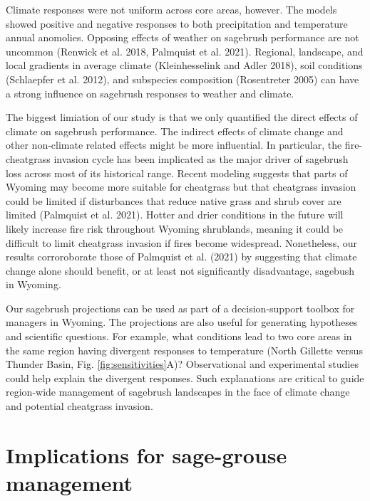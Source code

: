 \documentclass[
  12pt,
]{article}
\begin{document}
Climate responses were not uniform across core areas, however.
The models showed positive and negative responses to both precipitation and temperature annual anomolies.
Opposing effects of weather on sagebrush performance are not uncommon (Renwick et al. 2018, Palmquist et al. 2021).
Regional, landscape, and local gradients in average climate (Kleinhesselink and Adler 2018), soil conditions (Schlaepfer et al. 2012), and subspecies composition (Rosentreter 2005) can have a strong influence on sagebrush responses to weather and climate.

The biggest limiation of our study is that we only quantified the direct effects of climate on sagebrush performance.
The indirect effects of climate change and other non-climate related effects might be more influential.
In particular, the fire-cheatgrass invasion cycle has been implicated as the major driver of sagebrush loss across most of its historical range.
Recent modeling suggests that parts of Wyoming may become more suitable for cheatgrass but that cheatgrass invasion could be limited if disturbances that reduce native grass and shrub cover are limited (Palmquist et al. 2021).
Hotter and drier conditions in the future will likely increase fire risk throughout Wyoming shrublands, meaning it could be difficult to limit cheatgrass invasion if fires become widespread.
Nonetheless, our results corroroborate those of Palmquist et al. (2021) by suggesting that climate change alone should benefit, or at least not significantly disadvantage, sagebush in Wyoming.

Our sagebrush projections can be used as part of a decision-support toolbox for managers in Wyoming.
The projections are also useful for generating hypotheses and scientific questions.
For example, what conditions lead to two core areas in the same region having divergent responses to temperature (North Gillette versus Thunder Basin, Fig. \ref{fig:sensitivities}A)?
Observational and experimental studies could help explain the divergent responses.
Such explanations are critical to guide region-wide management of sagebrush landscapes in the face of climate change and potential cheatgrass invasion.

\hypertarget{implications-for-sage-grouse-management}{%
\section{Implications for sage-grouse management}\label{implications-for-sage-grouse-management}}
\end{document}
